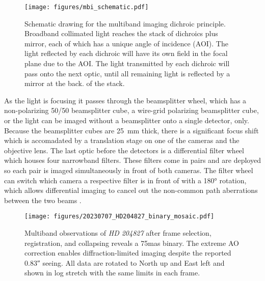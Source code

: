 \begin{figure}
    \centering
    \texttt{[image: figures/mbi\_schematic.pdf]}
    \caption{Schematic drawing for the multiband imaging dichroic principle. Broadband collimated light reaches the stack of dichroics plus mirror, each of which has a unique angle of incidence (AOI). The light reflected by each dichroic will have its own field in the focal plane due to the AOI. The light transmitted by each dichroic will pass onto the next optic, until all remaining light is reflected by a mirror at the back. of the stack.\label{fig:mbi_schematic}}
\end{figure}

As the light is focusing it passes through the beamsplitter wheel, which has a non-polarizing 50/50 beamsplitter cube, a wire-grid polarizing beamsplitter cube, or the light can be imaged without a beamsplitter onto a single detector, only. Because the beamsplitter cubes are \SI{25}{\milli\meter} thick, there is a significant focus shift which is accomadated by a translation stage on one of the cameras and the objective lens. The last optic before the detectors is a differential filter wheel which houses four narrowband filters. These filters come in pairs and are deployed so each pair is imaged simultaneously in front of both cameras. The filter wheel can switch which camera a respective filter is in front of with a \ang{180} rotation, which allows differential imaging to cancel out the non-common path aberrations between the two beams \citep{uyama_high-contrast_2020}.

\begin{figure}
    \centering
    \texttt{[image: figures/20230707\_HD204827\_binary\_mosaic.pdf]}
    \caption{Multiband observations of \textit{HD 204827} after frame selection, registration, and collapsing reveals a \si{75}{mas} binary. The extreme AO correction enables diffraction-limited imaging despite the reported \ang{;;0.83} seeing. All data are rotated to North up and East left and shown in log stretch with the same limits in each frame.\label{fig:binary}}
\end{figure}

